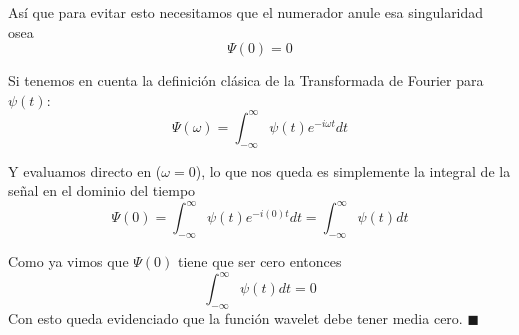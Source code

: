 Así que para evitar esto necesitamos que el numerador anule esa singularidad osea
\begin{equation*}
    \Psi(0) = 0
\end{equation*}

Si tenemos en cuenta la definición clásica de la Transformada de Fourier para $\psi(t)$:
\begin{equation*}
    \Psi(\omega) = \int_{-\infty}^{\infty} \psi(t) e^{-i\omega t} dt
\end{equation*}

Y evaluamos directo en ($\omega = 0$), lo que nos queda es simplemente la integral de la señal en el dominio del tiempo 
\begin{equation*}
    \Psi(0) = \int_{-\infty}^{\infty} \psi(t) e^{-i(0) t} dt = \int_{-\infty}^{\infty} \psi(t) dt
\end{equation*}

Como ya vimos que $\Psi(0)$ tiene que ser cero entonces
\begin{equation*}
    \int_{-\infty}^{\infty} \psi(t) dt = 0
\end{equation*}
Con esto queda evidenciado que la función wavelet debe tener media cero. \hfill $\blacksquare$\vspace{1cm}
